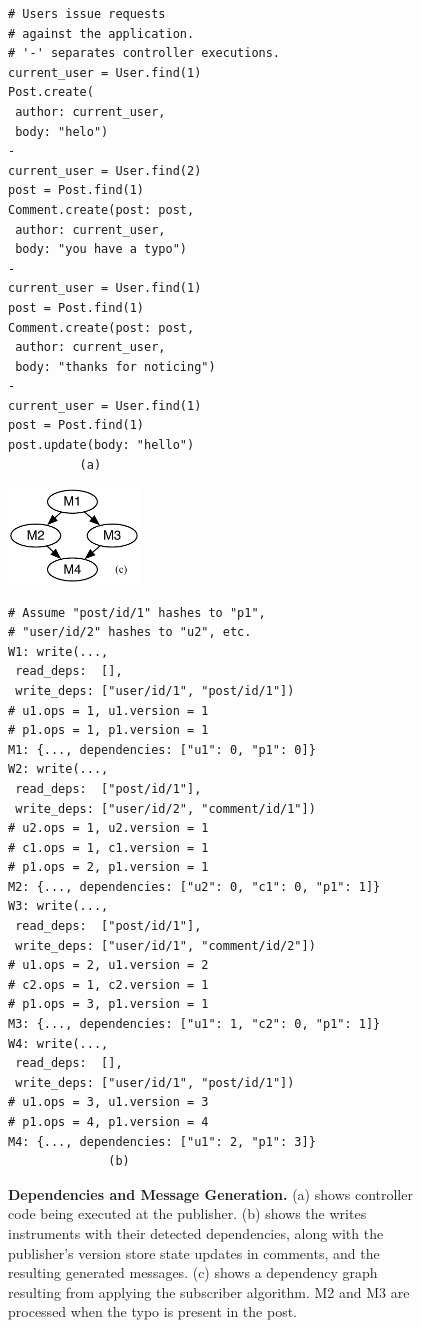 \begin{figure}
\centering
\begin{minipage}{.34\textwidth}
  \footnotesize
  \begin{rbox}
\begin{lstlisting}
# Users issue requests
# against the application.
# '-' separates controller executions.
current_user = User.find(1)
Post.create(
 author: current_user,
 body: "helo")
-
current_user = User.find(2)
post = Post.find(1)
Comment.create(post: post,
 author: current_user,
 body: "you have a typo")
-
current_user = User.find(1)
post = Post.find(1)
Comment.create(post: post,
 author: current_user,
 body: "thanks for noticing")
-
current_user = User.find(1)
post = Post.find(1)
post.update(body: "hello")
          (a)
\end{lstlisting}
  \end{rbox}
\hspace{2.7em}
\includegraphics[width=3.5cm]{figures/synapse/dep-graph.pdf}
\end{minipage}
\hspace{3em}
\begin{minipage}{0.45\textwidth}
  \footnotesize
  \begin{rbox}
\begin{lstlisting}
# Assume "post/id/1" hashes to "p1",
# "user/id/2" hashes to "u2", etc.
W1: write(...,
 read_deps:  [],
 write_deps: ["user/id/1", "post/id/1"])
# u1.ops = 1, u1.version = 1
# p1.ops = 1, p1.version = 1
M1: {..., dependencies: ["u1": 0, "p1": 0]}
W2: write(...,
 read_deps:  ["post/id/1"],
 write_deps: ["user/id/2", "comment/id/1"])
# u2.ops = 1, u2.version = 1
# c1.ops = 1, c1.version = 1
# p1.ops = 2, p1.version = 1
M2: {..., dependencies: ["u2": 0, "c1": 0, "p1": 1]}
W3: write(...,
 read_deps:  ["post/id/1"],
 write_deps: ["user/id/1", "comment/id/2"])
# u1.ops = 2, u1.version = 2
# c2.ops = 1, c2.version = 1
# p1.ops = 3, p1.version = 1
M3: {..., dependencies: ["u1": 1, "c2": 0, "p1": 1]}
W4: write(...,
 read_deps:  [],
 write_deps: ["user/id/1", "post/id/1"])
# u1.ops = 3, u1.version = 3
# p1.ops = 4, p1.version = 4
M4: {..., dependencies: ["u1": 2, "p1": 3]}
              (b)
\end{lstlisting}
  \end{rbox}
\end{minipage}

\caption{{\bf Dependencies and Message Generation.}
(a) shows controller code being executed at the publisher.
(b) shows the writes \synapse instruments with their detected
  dependencies, along with the publisher's version store state updates
  in comments, and the resulting generated messages.
(c) shows a dependency graph resulting from applying the subscriber algorithm.
M2 and M3 are processed when the typo is present in the post.
}
\label{synapse:fig:deps-example}
\end{figure}

